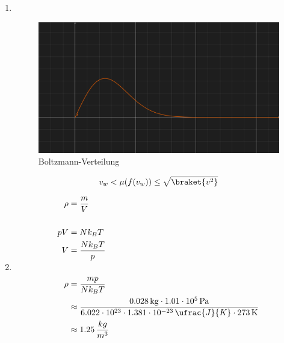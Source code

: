\documentclass[11pt,letterpaper]{article}
\begin{document}
\begin{enumerate}
\begin{enumerate}
      \item \, \\
      \begin{figure}[]
        \includegraphics[width = 0.8 \textwidth]{1.png}
        \caption{Boltzmann-Verteilung}
        \centering
      \end{figure}
      
        \begin{align*}
          v_w < \mu(f(v_w)) \le \sqrt{\braket{v^2}}
        \end{align*}

      \item
        \begin{align*}
          \rho &= \frac{m}{V}\\
          \\
          pV &= Nk_B T\\
          V &= \frac{Nk_BT}{p}\\
          \\
          \rho &= \frac{mp}{Nk_BT}\\
          &\approx \frac{0.028\,\mathrm{kg}\cdot 1.01\cdot 10^{5}\,\mathrm{Pa}}
          {6.022\cdot 10^{23} \cdot 1.381\cdot 10^{-23}\,\ufrac{J}{K} \cdot 273\,\mathrm{K}}\\
          &\approx 1.25 \,\frac{kg}{m^3} 
        \end{align*}


\end{enumerate}
\end{enumerate}
\end{document}
